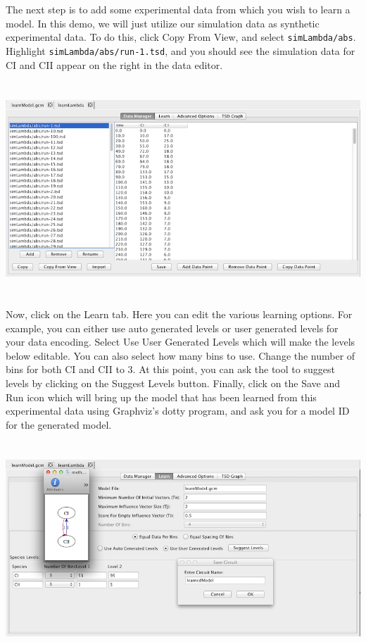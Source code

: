 \documentclass[titlepage,11pt]{article}
\begin{document}
The next step is to add some experimental data from which you wish to learn a model.  In this demo, we will just utilize our simulation data as synthetic experimental data.  To do this, click Copy From View, and select {\tt simLambda/abs}.  Highlight {\tt simLambda/abs/run-1.tsd}, and you should see the simulation data for CI and CII appear on the right in the data editor. 

\begin{center}
\includegraphics[height=80mm]{screenshots/dataManager}
\end{center}

Now, click on the Learn tab.  Here you can edit the various learning options.  For example, you can either use auto generated levels or user generated levels for your data encoding.  Select Use User Generated Levels which will make the levels below editable.  You can also select how many bins to use.  Change the number of bins for both CI and CII to 3.  At this point, you can ask the tool to suggest levels by clicking on the Suggest Levels button.  Finally, click on the Save and Run icon which will bring up the model that has been learned from this experimental data
using Graphviz's dotty program, and ask you for a model ID for the generated model.  

\begin{center}
\includegraphics[height=80mm]{screenshots/learn}
\end{center}
\end{document}
